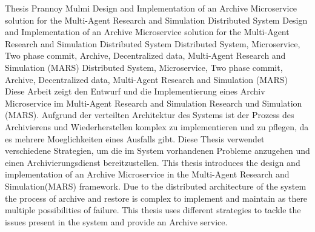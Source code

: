													{ Thesis }																			%
													{Prannoy Mulmi}														%
													{Design and Implementation of an Archive Microservice solution for the Multi-Agent Research and
													Simulation Distributed System}											  %
													{Design and Implementation of an Archive Microservice solution for the Multi-Agent Research and
													Simulation Distributed System}							%
													{Distributed System, Microservice, Two phase commit, Archive, Decentralized data, Multi-Agent Research and Simulation (MARS)}																		%
													{Distributed System, Microservice, Two phase commit, Archive, Decentralized data, Multi-Agent Research and Simulation (MARS)}																			%
													{Diese Arbeit zeigt den Entwurf und die Implementierung eines Archiv Microservice im Multi-Agent Research and Simulation
													Research und Simulation (MARS). Aufgrund der verteilten Architektur des Systems ist der Prozess des Archivierens
													und Wiederherstellen komplex zu implementieren und zu pflegen, da es mehrere Moeglichkeiten eines Ausfalls gibt. Diese Thesis
													verwendet verschiedene Strategien, um die im System vorhandenen Probleme anzugehen und einen Archivierungsdienst bereitzustellen.}	
													{This thesis introduces the design and implementation of an Archive Microservice in the Multi-Agent
													Research and Simulation(MARS) framework. Due to the distributed architecture of the system the process of
													archive and restore is complex to implement and maintain as there multiple possibilities of failure. This thesis
													uses different strategies to tackle the issues present in the system and provide an Archive service.}	

												
  									  													


	  																							

